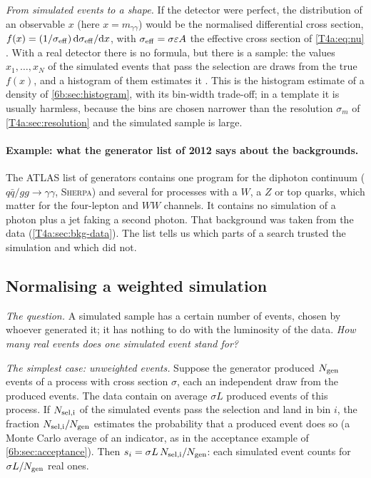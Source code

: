 \emph{From simulated events to a shape.} If the detector were perfect, the distribution of an observable $x$ (here $x=m_{\gamma\gamma}$) would be the normalised differential cross section, $f(x)=(1/\sigma_{\rm eff})\,\mathrm{d}\sigma_{\rm eff}/\mathrm{d} x$, with $\sigma_{\rm eff}=\sigma\varepsilon A$ the effective cross section of \eqref{T4a:eq:nu} \cite[(17)]{Cranmer2015}. With a real detector there is no formula, but there is a sample: the values $x_1,\dots,x_N$ of the simulated events that pass the selection are draws from the true $f(x)$, and a histogram of them estimates it \cite[(18)]{Cranmer2015}. This is the histogram estimate of a density of \cref{6b:sec:histogram}, with its bin-width trade-off; in a template it is usually harmless, because the bins are chosen narrower than the resolution $\sigma_m$ of \cref{T4a:sec:resolution} and the simulated sample is large.

\paragraph{Example: what the generator list of 2012 says about the backgrounds.}
The ATLAS list of generators \cite[Table~1]{AadHiggs2012} contains one program for the diphoton continuum ($q\bar q/gg\to\gamma\gamma$, \textsc{Sherpa}) and several for processes with a $W$, a $Z$ or top quarks, which matter for the four-lepton and $WW$ channels. It contains no simulation of a photon plus a jet faking a second photon. That background was taken from the data (\cref{T4a:sec:bkg-data}). The list tells us which parts of a search trusted the simulation and which did not.

\subsection{Normalising a weighted simulation}
\label{T4a:sec:weights}

\emph{The question.} A simulated sample has a certain number of events, chosen by whoever generated it; it has nothing to do with the luminosity of the data. \emph{How many real events does one simulated event stand for?}

\emph{The simplest case: unweighted events.} Suppose the generator produced $N_{\rm gen}$ events of a process with cross section $\sigma$, each an independent draw from the produced events. The data contain on average $\sigma L$ produced events of this process. If $N_{\rm sel,i}$ of the simulated events pass the selection and land in bin $i$, the fraction $N_{\rm sel,i}/N_{\rm gen}$ estimates the probability that a produced event does so (a Monte Carlo average of an indicator, as in the acceptance example of \cref{6b:sec:acceptance}). Then $s_i=\sigma L\,N_{\rm sel,i}/N_{\rm gen}$: each simulated event counts for $\sigma L/N_{\rm gen}$ real ones.

